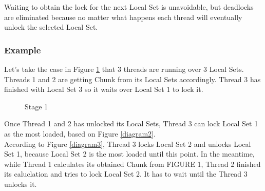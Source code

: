 \documentclass[12pt,a4paper]{article}
\begin{document}
Waiting to obtain the lock for the next Local Set is unavoidable, but deadlocks are eliminated because no matter what happens each thread will eventually unlock the selected Local Set.

\subsubsection{Example}
Let's take the case in Figure \ref{diagram1} that 3 threads are running over 3 Local Sets. Threads 1 and 2 are getting Chunk from its Local Sets accordingly. Thread 3 has finished with Local Set 3 so it waits over Local Set 1 to lock it.\\

\begin{figure}[h!]
	\centering
	\caption{Stage 1} \label{diagram1}
\end{figure}


Once Thread 1 and 2 has unlocked its Local Sets, Thread 3 can lock Local Set 1 as the most loaded, based on Figure \ref{diagram2}.\\

According to Figure \ref{diagram3}, Thread 3 locks Local Set 2 and unlocks Local Set 1, because Local Set 2 is the most loaded until this point. In the meantime, while Thread 1 calculates its obtained Chunk from FIGURE 1, Thread 2 finished its caluclation and tries to lock Local Set 2. It has to wait until the Thread 3 unlocks it.\\
 
\end{document}

